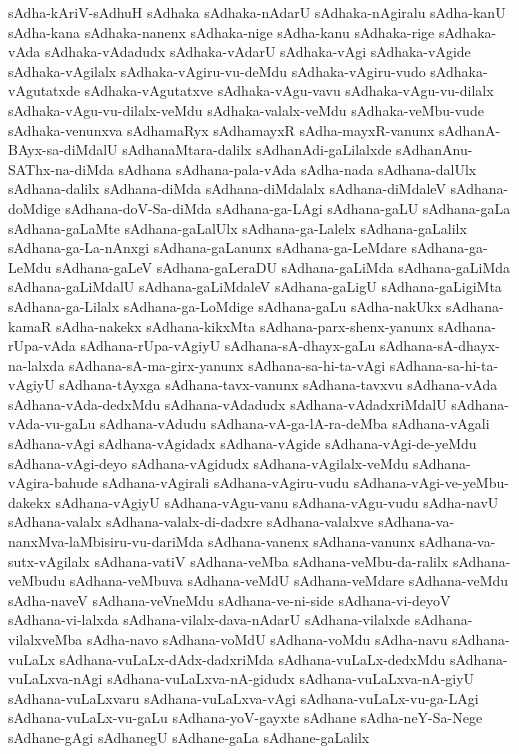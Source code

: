 {sAdha-kAriV-sAdhuH
sAdhaka
sAdhaka-nAdarU
sAdhaka-nAgiralu
sAdha-kanU
sAdha-kana
sAdhaka-nanenx
sAdhaka-nige
sAdha-kanu
sAdhaka-rige
sAdhaka-vAda
sAdhaka-vAdadudx
sAdhaka-vAdarU
sAdhaka-vAgi
sAdhaka-vAgide
sAdhaka-vAgilalx
sAdhaka-vAgiru-vu-deMdu
sAdhaka-vAgiru-vudo
sAdhaka-vAgutatxde
sAdhaka-vAgutatxve
sAdhaka-vAgu-vavu
sAdhaka-vAgu-vu-dilalx
sAdhaka-vAgu-vu-dilalx-veMdu
sAdhaka-valalx-veMdu
sAdhaka-veMbu-vude
sAdhaka-venunxva
sAdhamaRyx
sAdhamayxR
sAdha-mayxR-vanunx
sAdhanA-BAyx-sa-diMdalU
sAdhanaMtara-dalilx
sAdhanAdi-gaLilalxde
sAdhanAnu-SAThx-na-diMda
sAdhana
sAdhana-pala-vAda
sAdha-nada
sAdhana-dalUlx
sAdhana-dalilx
sAdhana-diMda
sAdhana-diMdalalx
sAdhana-diMdaleV
sAdhana-doMdige
sAdhana-doV-Sa-diMda
sAdhana-ga-LAgi
sAdhana-gaLU
sAdhana-gaLa
sAdhana-gaLaMte
sAdhana-gaLalUlx
sAdhana-ga-Lalelx
sAdhana-gaLalilx
sAdhana-ga-La-nAnxgi
sAdhana-gaLanunx
sAdhana-ga-LeMdare
sAdhana-ga-LeMdu
sAdhana-gaLeV
sAdhana-gaLeraDU
sAdhana-gaLiMda
sAdhana-gaLiMda
sAdhana-gaLiMdalU
sAdhana-gaLiMdaleV
sAdhana-gaLigU
sAdhana-gaLigiMta
sAdhana-ga-Lilalx
sAdhana-ga-LoMdige
sAdhana-gaLu
sAdha-nakUkx
sAdhana-kamaR
sAdha-nakekx
sAdhana-kikxMta
sAdhana-parx-shenx-yanunx
sAdhana-rUpa-vAda
sAdhana-rUpa-vAgiyU
sAdhana-sA-dhayx-gaLu
sAdhana-sA-dhayx-na-lalxda
sAdhana-sA-ma-girx-yanunx
sAdhana-sa-hi-ta-vAgi
sAdhana-sa-hi-ta-vAgiyU
sAdhana-tAyxga
sAdhana-tavx-vanunx
sAdhana-tavxvu
sAdhana-vAda
sAdhana-vAda-dedxMdu
sAdhana-vAdadudx
sAdhana-vAdadxriMdalU
sAdhana-vAda-vu-gaLu
sAdhana-vAdudu
sAdhana-vA-ga-lA-ra-deMba
sAdhana-vAgali
sAdhana-vAgi
sAdhana-vAgidadx
sAdhana-vAgide
sAdhana-vAgi-de-yeMdu
sAdhana-vAgi-deyo
sAdhana-vAgidudx
sAdhana-vAgilalx-veMdu
sAdhana-vAgira-bahude
sAdhana-vAgirali
sAdhana-vAgiru-vudu
sAdhana-vAgi-ve-yeMbu-dakekx
sAdhana-vAgiyU
sAdhana-vAgu-vanu
sAdhana-vAgu-vudu
sAdha-navU
sAdhana-valalx
sAdhana-valalx-di-dadxre
sAdhana-valalxve
sAdhana-va-nanxMva-laMbisiru-vu-dariMda
sAdhana-vanenx
sAdhana-vanunx
sAdhana-va-sutx-vAgilalx
sAdhana-vatiV
sAdhana-veMba
sAdhana-veMbu-da-ralilx
sAdhana-veMbudu
sAdhana-veMbuva
sAdhana-veMdU
sAdhana-veMdare
sAdhana-veMdu
sAdha-naveV
sAdhana-veVneMdu
sAdhana-ve-ni-side
sAdhana-vi-deyoV
sAdhana-vi-lalxda
sAdhana-vilalx-dava-nAdarU
sAdhana-vilalxde
sAdhana-vilalxveMba
sAdha-navo
sAdhana-voMdU
sAdhana-voMdu
sAdha-navu
sAdhana-vuLaLx
sAdhana-vuLaLx-dAdx-dadxriMda
sAdhana-vuLaLx-dedxMdu
sAdhana-vuLaLxva-nAgi
sAdhana-vuLaLxva-nA-gidudx
sAdhana-vuLaLxva-nA-giyU
sAdhana-vuLaLxvaru
sAdhana-vuLaLxva-vAgi
sAdhana-vuLaLx-vu-ga-LAgi
sAdhana-vuLaLx-vu-gaLu
sAdhana-yoV-gayxte
sAdhane
sAdha-neY-Sa-Nege
sAdhane-gAgi
sAdhanegU
sAdhane-gaLa
sAdhane-gaLalilx
}
